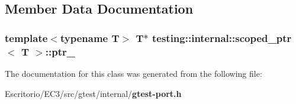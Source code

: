 \subsection{Member Data Documentation}
\subsubsection{\setlength{\rightskip}{0pt plus 5cm}template$<$typename T$>$ T$\ast$ {\bf testing::internal::scoped\_\-ptr}$<$ T $>$::{\bf ptr\_\-}\hspace{0.3cm}{\tt  [private]}}\label{classtesting_1_1internal_1_1scoped__ptr_e3a07cf93fd19d2be0f294e605c23f62}




The documentation for this class was generated from the following file:\begin{CompactItemize}
\item 
Escritorio/EC3/src/gtest/internal/{\bf gtest-port.h}\end{CompactItemize}
